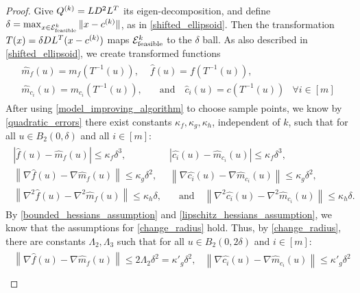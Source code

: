 \begin{proof}
Give ${Q^{(k)}} = LD^2L^T$ its eigen-decomposition, and define $\delta = \max_{x \in {\mathcal E^k_{\textrm{feasible}}}} \|x - c^{(k)}\|$, as in \cref{shifted_ellipsoid}.
Then the transformation $T(x) = \delta D L^T(x - c^{(k)})$ maps ${\mathcal E^k_{\textrm{feasible}}}$ to the $\delta$ ball.
As also described in \cref{shifted_ellipsoid}, we create transformed functions
\begin{align*}
\begin{array}{ccc}
\hat {m}_f(u) = m_f(T^{-1}(u)),&  \hat f (u) = f(T^{-1}(u)), &\\
\hat {m}_{c_i}(u) = m_{c_i}(T^{-1}(u)), &  \quad \textrm{and} \quad \hat c_i (u) = c(T^{-1}(u))& \forall i \in [m]
\end{array}
\end{align*}
After using \cref{model_improving_algorithm} to choose sample points, we know by \cref{quadratic_errors} 
there exist constants $\kappa_f, \kappa_g, \kappa_h$, independent of $k$, such that for all $u \in B_2(0, \delta)$ and all $i \in [m]$:
\begin{align*}
\begin{array}{cc}
\left| \hat {f}\left(u\right) -  \hat{m}_f\left(u\right) \right|\le \kappa_f \delta^3, &
\left| \hat {{c_i}}\left(u\right) -  \hat{m}_{c_i}\left(u\right) \right|\le \kappa_f \delta^3, \\
\left\|\nabla \hat {f}\left(u\right) - \nabla \hat{m}_f\left(u\right) \right\|\le \kappa_g \delta^2, &
\left\|\nabla \hat {{c_i}}\left(u\right) - \nabla \hat{m}_{c_i}\left(u\right) \right\|\le \kappa_g \delta^2, \\
\left\|\nabla^2 \hat {f}\left(u\right) - \nabla^2 \hat{m}_f\left(u\right) \right\|\le \kappa_h \delta, &
\quad \textrm{and} \quad \left\|\nabla^2 \hat {{c_i}}\left(u\right) - \nabla^2 \hat{m}_{c_i}\left(u\right) \right\|\le \kappa_h \delta.
\end{array}
\end{align*}
By \cref{bounded_hessians_assumption} and \cref{lipschitz_hessians_assumption}, we know that the assumptions for \cref{change_radius} hold.
Thus,  by \cref{change_radius}, there are constants $\Lambda_2, \Lambda_3$ such that for all $u \in B_2(0, 2\delta)$ and $i \in [m]$:
\begin{align*}
\begin{array}{cc}
\left\|\nabla \hat {f}\left(u\right) - \nabla \hat{m}_f\left(u\right) \right\|\le 2\Lambda_2 \delta^2 = {\kappa'}_g\delta^2, &
\left\|\nabla \hat {c_i}\left(u\right) - \nabla \hat{m}_{c_i}\left(u\right) \right\|\le {\kappa'}_g\delta^2 \\

\end{array}
\end{align*}
\end{proof}
